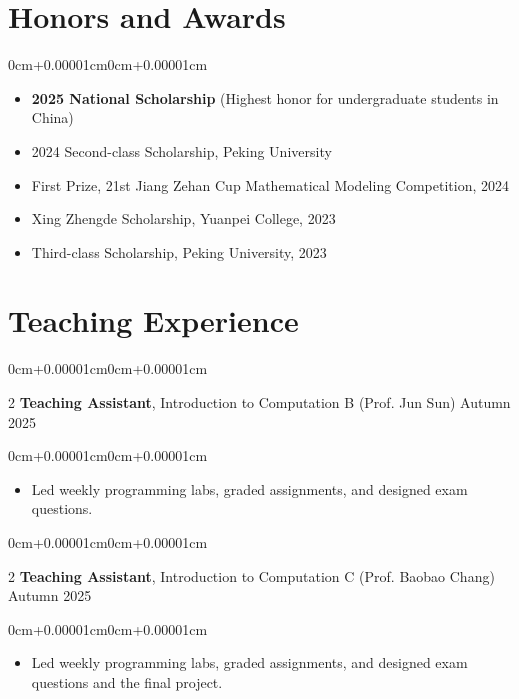 \documentclass[10pt, letterpaper]{article}
\newenvironment{highlights}{\begin{itemize}[topsep=0.10cm,parsep=0.10cm,partopsep=0pt,itemsep=0pt,leftmargin=0cm+10pt]}{\end{itemize}}
\newenvironment{onecolentry}{\begin{adjustwidth}{0cm+0.00001cm}{0cm+0.00001cm}}{\end{adjustwidth}}
\newenvironment{twocolentry}[2][]{\onecolentry\def\secondColumn{#2}\setcolumnwidth{\fill, 4.5cm}\begin{paracol}{2}}{\switchcolumn \raggedleft \secondColumn\end{paracol}\endonecolentry}
\begin{document}
    
    \section{Honors and Awards}

    \begin{onecolentry}
        \begin{highlights}
            \item \textbf{2025 National Scholarship} (Highest honor for undergraduate students in China)
            \item 2024 Second-class Scholarship, Peking University
            \item First Prize, 21st Jiang Zehan Cup Mathematical Modeling Competition, 2024
            \item Xing Zhengde Scholarship, Yuanpei College, 2023
            \item Third-class Scholarship, Peking University, 2023
        \end{highlights}
    \end{onecolentry}

    \section{Teaching Experience}

    \begin{twocolentry}{Autumn 2025}
        \textbf{Teaching Assistant}, Introduction to Computation B  (Prof. Jun Sun)
    \end{twocolentry}
    \vspace{0.10cm}
    \begin{onecolentry}
        \begin{highlights}
            \item Led weekly programming labs, graded assignments, and designed exam questions.
        \end{highlights}
    \end{onecolentry}

    \vspace{0.2cm}

    \begin{twocolentry}{Autumn 2025}
        \textbf{Teaching Assistant}, Introduction to Computation C (Prof. Baobao Chang)
    \end{twocolentry}
    \vspace{0.10cm}
    \begin{onecolentry}
        \begin{highlights}
            \item Led weekly programming labs, graded assignments, and designed exam questions and the final project.
        \end{highlights}
    \end{onecolentry}
\end{document}
